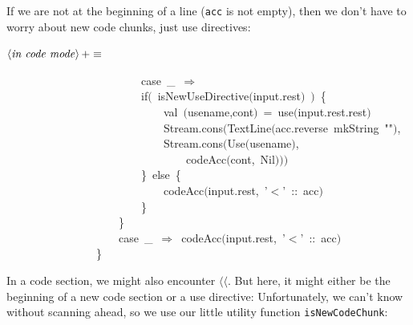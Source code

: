 \documentclass[a4paper,12pt]{article}
\begin{document}
If we are not at the beginning of a line (\texttt{acc} is not empty), then
we don't have to worry about new code chunks, just use directives:

$\left<\mbox{\emph{in code mode}}\right>+\equiv$
\begin{program}~~~~~~~~~~~~~~~~~~~~~~~~{\vem case}~\_~$\Rightarrow$
\\~~~~~~~~~~~~~~~~~~~~~~~~{\vem if}$($~isNewUseDirective$($input.rest$)$~$)$~{\small\{}
\\~~~~~~~~~~~~~~~~~~~~~~~~~~~~{\vem val}~$($usename,cont$)$~=~use$($input.rest.rest$)$
\\~~~~~~~~~~~~~~~~~~~~~~~~~~~~Stream.cons$($TextLine$($acc.reverse~mkString~""$)$,
\\~~~~~~~~~~~~~~~~~~~~~~~~~~~~Stream.cons$($Use$($usename$)$,
\\~~~~~~~~~~~~~~~~~~~~~~~~~~~~~~~~codeAcc$($cont,~Nil$)$$)$$)$
\\~~~~~~~~~~~~~~~~~~~~~~~~{\small\}}~{\vem else}~{\small\{}
\\~~~~~~~~~~~~~~~~~~~~~~~~~~~~codeAcc$($input.rest,~'$<$'~{\rm :}{\rm :}~acc$)$
\\~~~~~~~~~~~~~~~~~~~~~~~~{\small\}}
\\~~~~~~~~~~~~~~~~~~~~{\small\}}
\\~~~~~~~~~~~~~~~~~~~~{\vem case}~\_~$\Rightarrow$~codeAcc$($input.rest,~'$<$'~{\rm :}{\rm :}~acc$)$
\\~~~~~~~~~~~~~~~~{\small\}}
\\[0.5em]\end{program}


In a code section, we might also encounter \texttt{$\langle$$\langle$}. But here, it might either
be the beginning of a new code section or a use directive: Unfortunately,
we can't know without scanning ahead, so we use our little utility
function \texttt{isNewCodeChunk}:
\end{document}
